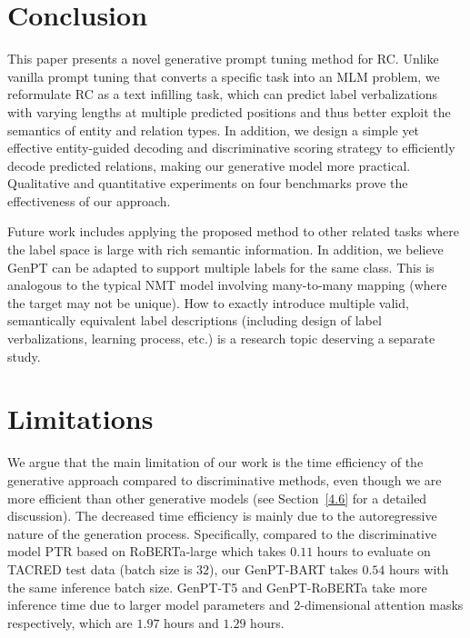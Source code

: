 \documentclass[11pt]{article}
\begin{document}
\section{Conclusion}
This paper presents a novel generative prompt tuning method for RC. Unlike vanilla prompt tuning that converts a specific task into an MLM problem, we reformulate RC as a text infilling task, which can predict label verbalizations with varying lengths at multiple predicted positions and thus better exploit the semantics of entity and relation types. In addition, we design a simple yet effective entity-guided decoding and discriminative scoring strategy to efficiently decode predicted relations, making our generative model more practical. Qualitative and quantitative experiments on four benchmarks prove the effectiveness of our approach. 

Future work includes applying the proposed method to other related tasks where the label space is large with rich semantic information. In addition, we believe GenPT can be adapted to support multiple labels for the same class. This is analogous to the typical NMT model involving many-to-many mapping (where the target may not be unique). How to exactly introduce multiple valid, semantically equivalent label descriptions (including design of label verbalizations, learning process, etc.) is a research topic deserving a separate study.


\section*{Limitations}\label{limitations}
We argue that the main limitation of our work is the time efficiency of the generative approach compared to discriminative methods, even though we are more efficient than other generative models (see Section~\ref{4.6} for a detailed discussion). The decreased time efficiency is mainly due to the autoregressive nature of the generation process. Specifically, compared to the discriminative model PTR based on RoBERTa-large which takes $0.11$ hours to evaluate on TACRED test data (batch size is $32$), our GenPT-BART takes $0.54$ hours with the same inference batch size. GenPT-T5 and GenPT-RoBERTa take more inference time due to larger model parameters and 2-dimensional attention masks respectively, which are $1.97$ hours and $1.29$ hours.
\end{document}
